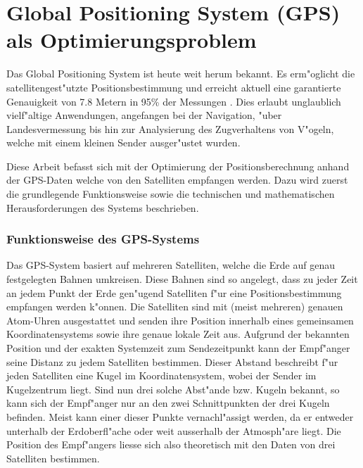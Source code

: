 %
%
%

\chapter{Global Positioning System (GPS) als Optimierungsproblem}


\begin{refsection}

Das Global Positioning System ist heute weit herum bekannt. Es
erm"oglicht die satellitengest"utzte Positionsbestimmung und erreicht
aktuell eine garantierte Genauigkeit von 7.8 Metern in 95\% der Messungen
\cite{gps:wiki}. Dies erlaubt unglaublich vielf"altige
Anwendungen, angefangen bei der Navigation, "uber Landesvermessung bis
hin zur Analysierung des Zugverhaltens von V"ogeln, welche mit einem
kleinen Sender ausger"ustet wurden.

Diese Arbeit befasst sich mit der Optimierung der Positionsberechnung
anhand der GPS-Daten welche von den Satelliten empfangen werden. Dazu
wird zuerst die grundlegende Funktionsweise sowie die technischen und
mathematischen Herausforderungen des Systems beschrieben.
	
\subsection{Funktionsweise des GPS-Systems}
Das GPS-System basiert auf mehreren Satelliten, welche die Erde auf
genau festgelegten Bahnen umkreisen. Diese Bahnen sind so angelegt, dass
zu jeder Zeit an jedem Punkt der Erde gen"ugend Satelliten f"ur eine
Positionsbestimmung empfangen werden k"onnen. Die Satelliten sind mit
(meist mehreren) genauen Atom-Uhren ausgestattet und senden ihre Position
innerhalb eines gemeinsamen Koordinatensystems sowie ihre genaue lokale
Zeit aus. Aufgrund der bekannten Position und der exakten Systemzeit zum
Sendezeitpunkt kann der Empf"anger seine Distanz zu jedem Satelliten
bestimmen. Dieser Abstand beschreibt f"ur jeden Satelliten eine Kugel
im Koordinatensystem, wobei der Sender im Kugelzentrum liegt. Sind nun
drei solche Abst"ande bzw. Kugeln bekannt, so kann sich der Empf"anger
nur an den zwei Schnittpunkten der drei Kugeln befinden. Meist kann
einer dieser Punkte vernachl"assigt werden, da er entweder unterhalb der
Erdoberfl"ache oder weit ausserhalb der Atmosph"are liegt. Die Position
des Empf"angers liesse sich also theoretisch mit den Daten von drei
Satelliten bestimmen.


\end{refsection}
